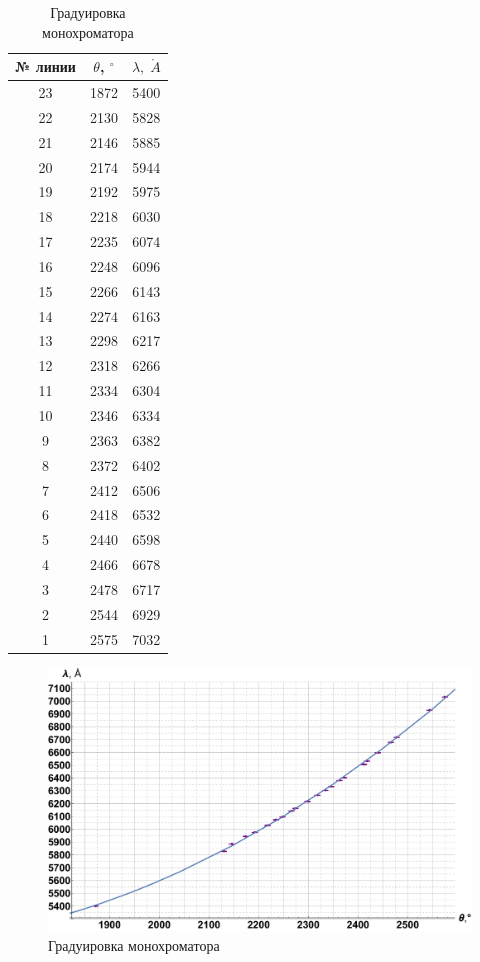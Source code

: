 \documentclass[12pt]{kiarticle}
\begin{document}
		\begin{table}[h!]
		\caption{Градуировка монохроматора}
		\begin{center}
			\begin{tabular}{|c|c|c|}
				\hline 
				№  линии & $ \theta $, $ ^\circ $ & $ \lambda, \;\mathring{A} $   \\ 
				\hline 
			23 & 1872 & 5400 \\
			22 & 2130 & 5828 \\
			21 & 2146 & 5885 \\
			20 & 2174 & 5944 \\
			19 & 2192 & 5975 \\
			18 & 2218 & 6030 \\
			17 & 2235 & 6074 \\
			16 & 2248 & 6096 \\
			15 & 2266 & 6143 \\
			14 & 2274 & 6163 \\
			13 & 2298 & 6217 \\
			12 & 2318 & 6266 \\
			11 & 2334 & 6304 \\
			10 & 2346 & 6334 \\
			9 & 2363 & 6382 \\
			8 & 2372 & 6402 \\
			7 & 2412 & 6506 \\
			6 & 2418 & 6532 \\
			5 & 2440 & 6598 \\
			4 & 2466 & 6678 \\
			3 & 2478 & 6717 \\
			2 & 2544 & 6929 \\
			1 & 2575 & 7032 \\
				\hline 
			\end{tabular} 
		\end{center}
		\label{table g}
	\end{table}

\begin{figure}[h!]
	\includegraphics[scale=0.5]{G.pdf}
	\caption{Градуировка монохроматора}
	\label{graf_g}
\end{figure} 
\end{document}
